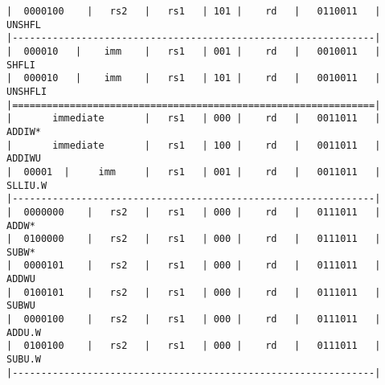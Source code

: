 \begin{minipage}{\linewidth}
\begin{verbatim}
|  0000100    |   rs2   |   rs1   | 101 |    rd   |   0110011   |  UNSHFL
|---------------------------------------------------------------|
|  000010   |    imm    |   rs1   | 001 |    rd   |   0010011   |  SHFLI
|  000010   |    imm    |   rs1   | 101 |    rd   |   0010011   |  UNSHFLI
|===============================================================|
|       immediate       |   rs1   | 000 |    rd   |   0011011   |  ADDIW*
|       immediate       |   rs1   | 100 |    rd   |   0011011   |  ADDIWU
|  00001  |     imm     |   rs1   | 001 |    rd   |   0011011   |  SLLIU.W
|---------------------------------------------------------------|
|  0000000    |   rs2   |   rs1   | 000 |    rd   |   0111011   |  ADDW*
|  0100000    |   rs2   |   rs1   | 000 |    rd   |   0111011   |  SUBW*
|  0000101    |   rs2   |   rs1   | 000 |    rd   |   0111011   |  ADDWU
|  0100101    |   rs2   |   rs1   | 000 |    rd   |   0111011   |  SUBWU
|  0000100    |   rs2   |   rs1   | 000 |    rd   |   0111011   |  ADDU.W
|  0100100    |   rs2   |   rs1   | 000 |    rd   |   0111011   |  SUBU.W
|---------------------------------------------------------------|
\end{verbatim}
\end{minipage}

